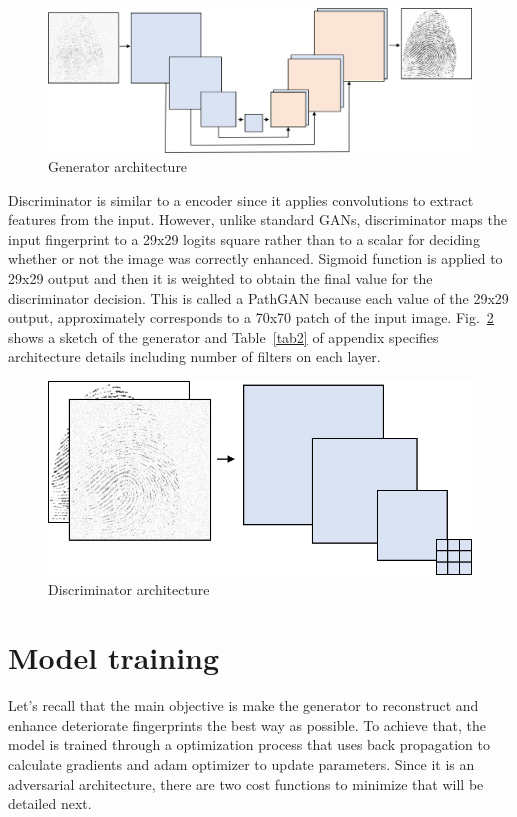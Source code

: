 \documentclass[a4paper,fleqn]{cas-dc}
\begin{document}
\begin{figure}[htbp]
\centerline{\includegraphics[scale=0.37]{figs/generator.png}}
\caption{Generator architecture}
\label{fig4}
\end{figure}

Discriminator is similar to a encoder since it applies convolutions to extract features from the input. However, unlike standard GANs, discriminator maps the input fingerprint to a 29x29 logits square rather than to a scalar for deciding whether or not the image was correctly enhanced. Sigmoid function is applied to 29x29 output and then it is weighted to obtain the final value for the discriminator decision. This is called a PathGAN because each value of the 29x29 output, approximately corresponds to a 70x70 patch of the input image. Fig.~\ref{fig5} shows a sketch of the generator and Table~\ref{tab2} of appendix specifies architecture details including number of filters on each layer.

\begin{figure}[htbp]
\centerline{\includegraphics[scale=0.4]{figs/discriminator.png}}
\caption{Discriminator architecture}
\label{fig5}
\end{figure}

\section{Model training}
\label{sec:MT}

Let's recall that the main objective is make the generator to reconstruct and enhance deteriorate fingerprints the best way as possible. To achieve that, the model is trained through a optimization process that uses back propagation to calculate gradients and adam optimizer to update parameters. Since it is an adversarial architecture, there are two cost functions to minimize that will be detailed next.
\end{document}
